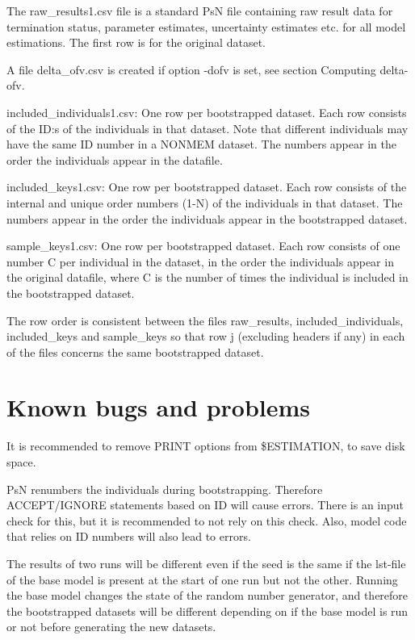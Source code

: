 The raw\_results1.csv file is a standard PsN file containing raw result data for termination status, parameter estimates, uncertainty estimates etc. for all model estimations. The first row is for the original dataset.

A file delta\_ofv.csv is created if option -dofv is set, see section Computing delta-ofv.

included\_individuals1.csv: One row per bootstrapped dataset. Each row consists of the ID:s of the individuals in that dataset. Note that different individuals may have the same ID number in a NONMEM dataset. The numbers appear in the order the individuals appear in the datafile.

included\_keys1.csv: One row per bootstrapped dataset. Each row consists of the internal and unique order numbers (1-N) of the individuals in that dataset. The numbers appear in the order the individuals appear in the bootstrapped dataset. 

sample\_keys1.csv:  One row per bootstrapped dataset. Each row consists of one number C per individual in the dataset, in the order the individuals appear in the original datafile, where C is the number of times the individual is included in the bootstrapped dataset. 

The row order is consistent between the files raw\_results, included\_individuals, included\_keys and sample\_keys so that row j (excluding headers if any) in each of the files concerns the same bootstrapped dataset.

\section{Known bugs and problems}

It is recommended to remove PRINT options from \$ESTIMATION, to save disk space.

PsN renumbers the individuals during bootstrapping. Therefore ACCEPT/IGNORE statements based on ID will cause errors. 
There is an input check for this, but it is recommended to not rely on this check. Also, model code that relies on ID numbers will also lead to
errors.

The results of two runs will be different even if the seed is the same if the lst-file of the base model is present at the start of one run but not the other. Running the base model changes the state of the random number generator, and therefore the bootstrapped datasets will be different depending on if the base model is run or not before generating the  new datasets. 

